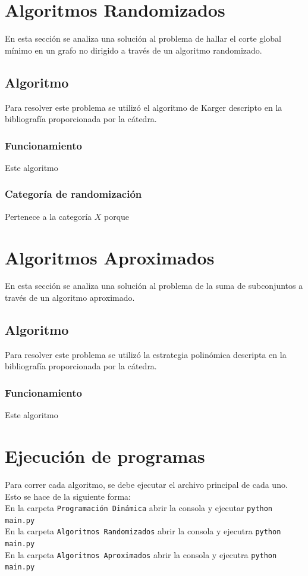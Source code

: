 \documentclass[a4paper, 10pt]{article}
\def\code#1{\texttt{#1}}
\newcommand\tab[1][0.5cm]{\hspace*{#1}}
\begin{document}
    \section{Algoritmos Randomizados}
        \tab En esta sección se analiza una solución al problema de hallar el corte global
        mínimo en un grafo no dirigido a través de un algoritmo randomizado.
        \subsection{Algoritmo}
            \tab Para resolver este problema se utilizó el algoritmo de Karger descripto en
            la bibliografía proporcionada por la cátedra.
            \subsubsection{Funcionamiento}
                \tab Este algoritmo %
            \subsubsection{Categoría de randomización}
                \tab Pertenece a la categoría $X$ porque %
    \newpage

    \section{Algoritmos Aproximados}
        \tab En esta sección se analiza una solución al problema de la suma de subconjuntos
        a través de un algoritmo aproximado.
        \subsection{Algoritmo}
            \tab Para resolver este problema se utilizó la estrategia polinómica descripta en
            la bibliografía proporcionada por la cátedra.
            \subsubsection{Funcionamiento}
                \tab Este algoritmo %
    \newpage

    \section{Ejecución de programas}
    \tab Para correr cada algoritmo, se debe ejecutar el archivo principal de cada uno.
    Esto se hace de la siguiente forma: \\
    \tab\tab En la carpeta \code{Programación Dinámica} abrir la consola y ejecutar \code{python main.py} \\
    \tab\tab En la carpeta \code{Algoritmos Randomizados} abrir la consola y ejecutra \code{python main.py} \\
    \tab\tab En la carpeta \code{Algoritmos Aproximados} abrir la consola y ejecutra \code{python main.py} \\

\end{document}

